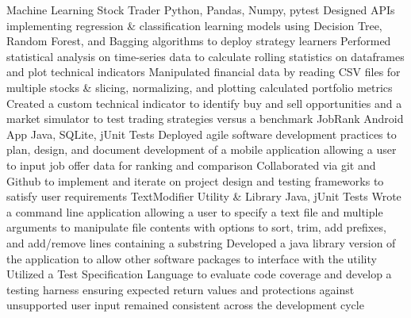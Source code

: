 %
%
%
%
%
\justifiedsubsection%
{Machine Learning Stock Trader}
{Python, Pandas, Numpy, pytest}
%
\workitemsFour%
{Designed APIs implementing regression \& classification learning models using Decision Tree, Random Forest, and Bagging algorithms to deploy strategy learners}
{Performed statistical analysis on time-series data to calculate rolling statistics on dataframes and plot technical indicators}
{Manipulated financial data by reading CSV files for multiple stocks \& slicing, normalizing, and plotting calculated portfolio metrics}
{Created a custom technical indicator to identify buy and sell opportunities and a market simulator to test trading strategies versus a benchmark}
%
%
%
%
\justifiedsubsection%
{JobRank Android App}
{Java, SQLite, jUnit Tests}
%
\workitemsTwo%
{Deployed agile software development practices to plan, design, and document development of a mobile application allowing a user to input job offer data for ranking and comparison}
{Collaborated via git and Github to implement and iterate on project design and testing frameworks to satisfy user requirements}
%
%
%
%
\justifiedsubsection%
{TextModifier Utility \& Library}
{Java, jUnit Tests}
%
\workitemsThree%
{Wrote a command line application allowing a user to specify a text file and multiple arguments to manipulate file contents with options to sort, trim, add prefixes, and add/remove lines containing a substring}
{Developed a java library version of the application to allow other software packages to interface with the utility}
{Utilized a Test Specification Language to evaluate code coverage and develop a testing harness ensuring expected return values and protections against unsupported user input remained consistent across the development cycle}
%
%
%
%
%
%
%
%